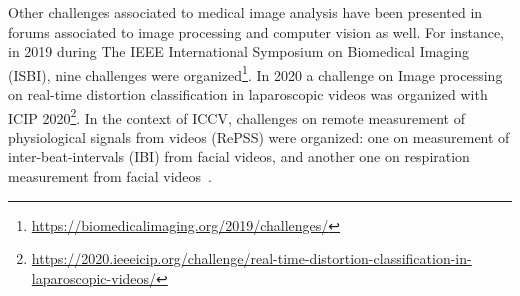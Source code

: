 \documentclass[twoside,11pt]{article}
\begin{document}
Other challenges associated to medical image analysis have been presented in forums associated to image processing and computer vision as well. For instance, in 2019 during The IEEE International Symposium on Biomedical Imaging (ISBI), %
nine challenges were organized\footnote{\url{https://biomedicalimaging.org/2019/challenges/}}. %
In 2020 a challenge on Image processing on real-time distortion classification in laparoscopic videos was organized with %
ICIP 2020\footnote{\url{https://2020.ieeeicip.org/challenge/real-time-distortion-classification-in-laparoscopic-videos/}}. %
In the context of ICCV, %
challenges on remote measurement of physiological signals from videos (RePSS) were organized: one on measurement of inter-beat-intervals (IBI) from facial videos, and another one on respiration measurement from facial videos~\citep{repss1, repss2}.
\end{document}
